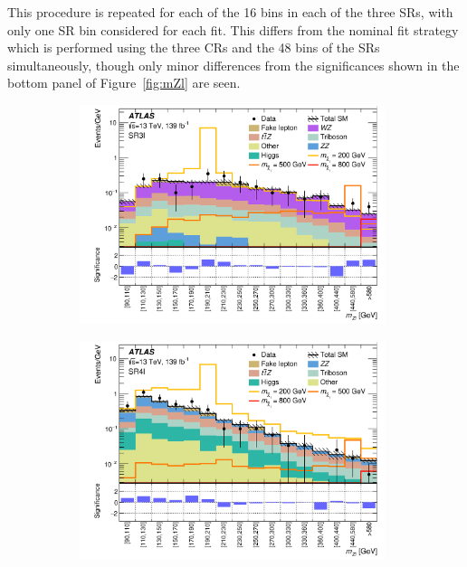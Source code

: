 This procedure is repeated for each of the 16 \mZl bins in each of the three SRs, with only one SR bin considered for each fit.
This differs from the nominal fit strategy which is performed using the three CRs and the 48 \mZl bins of the SRs simultaneously,
though only minor differences from the significances shown in the bottom panel of Figure~\ref{fig:mZl} are seen.
\begin{figure}[ht]
    \centering
    \begin{subfigure}[b]{0.49\textwidth}
      \centering
      \includegraphics[width=0.98\textwidth]{figs/rpvthreel/histpull_all_doSRsInBkg_SROL3l.png}
      \caption{}
      \label{fig:mZl_SR3l}
    \end{subfigure}
    \hfill
    \begin{subfigure}[b]{0.49\textwidth}
      \centering
      \includegraphics[width=0.98\textwidth]{figs/rpvthreel/histpull_all_doSRsInBkg_SROL4l.png}

\end{subfigure}
\end{figure}
